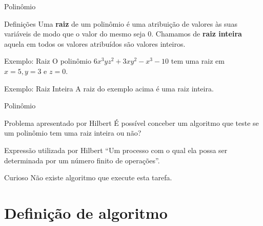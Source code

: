 \documentclass[xcolor=dvipsnames,table]{beamer}
\begin{document}
	\begin{frame}{Polinômio}
		\begin{block}{Definições}	
			Uma {\bf raiz} de um polinômio é uma atribuição de valores às suas variáveis de modo que o valor do mesmo seja 0. Chamamos de {\bf raiz inteira} aquela em todos os valores atribuídos são valores inteiros.
		\end{block}
		\begin{block}{Exemplo: Raiz}
			O polinômio $6x^3 y z^2 + 3x y^2 -x^3 - 10$ tem uma raiz em $x=5, y=3$ e $z=0$.
		\end{block}
		\begin{block}{Exemplo: Raiz Inteira}
			A raiz do exemplo acima é uma raiz inteira.
		\end{block}
	\end{frame}
	
	\begin{frame}{Polinômio}
		\begin{block}{Problema apresentado por Hilbert}
			É possível conceber um algoritmo que teste se um polinômio tem uma raiz inteira ou não?
		\end{block} 
		\begin{block}{Expressão utilizada por Hilbert}
			``Um processo com o qual ela possa ser determinada por um número finito de operações''.
		\end{block} 
		\begin{alertblock}{Curioso}
			Não existe algoritmo que execute esta tarefa.
		\end{alertblock}
	\end{frame}
	
	\section{Definição de algoritmo}	
	
\end{document}
